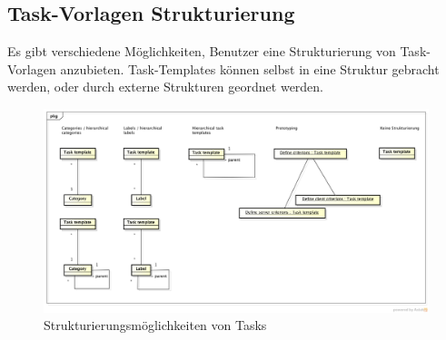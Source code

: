 		
		\subsection{Task-Vorlagen Strukturierung}
			Es gibt verschiedene Möglichkeiten, 
			Benutzer eine Strukturierung von Task-Vorlagen anzubieten.
			Task-Templates können selbst in eine Struktur gebracht werden, 
			oder durch externe Strukturen geordnet werden.
		
			\begin{figure}[H]
				\includegraphics[width=\textwidth]{architecture/media/img/taskTemplateStructure.png}
				\centering
				\caption{Strukturierungsmöglichkeiten von Tasks}
				\label{fig:taskTemplateStructure}
			\end{figure}
			
